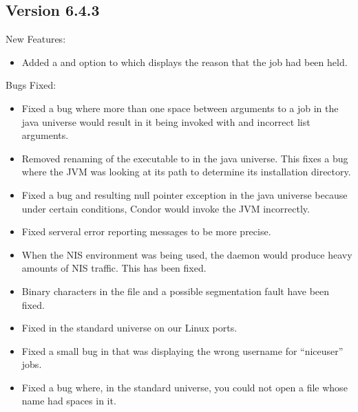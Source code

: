\subsection{\label{sec:New-6-4-3}Version 6.4.3}

\noindent New Features:
\begin{itemize}

\item Added a  and  option to  which 
displays the reason that the job had been held.

\end{itemize}

\noindent Bugs Fixed:
\begin{itemize}

\item Fixed a bug where more than one space between arguments to a job
in the java universe would result in it being invoked with and incorrect
list arguments.

\item Removed renaming of the executable to  in the java
universe. This fixes a bug where the JVM was looking at its path to determine
its installation directory.

\item Fixed a bug and resulting null pointer exception in the java universe
because under certain conditions, Condor would invoke the JVM incorrectly.

\item Fixed serveral error reporting messages to be more precise.

\item When the NIS environment was being used, the  daemon
would produce heavy amounts of NIS traffic. This has been fixed.

\item Binary characters in the  file and a possible
segmentation fault have been fixed.

\item Fixed  in the standard universe on our Linux ports.

\item Fixed a small bug in  that was displaying the wrong
username for ``niceuser'' jobs.

\item Fixed a bug where, in the standard universe, you could not open a file
whose name had spaces in it.


\end{itemize}
